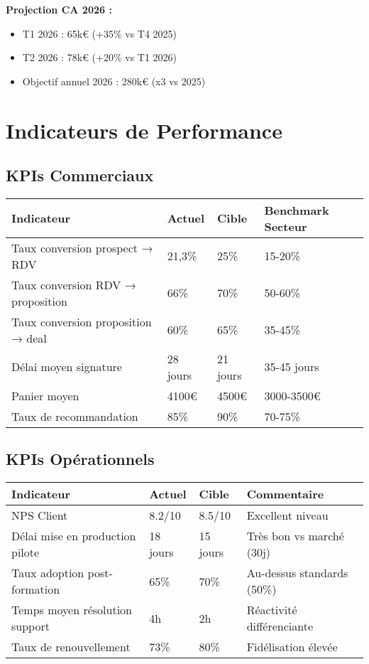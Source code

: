 \textbf{Projection CA 2026 :}
\begin{itemize}
    \item T1 2026 : 65k€ (+35\% vs T4 2025)
    \item T2 2026 : 78k€ (+20\% vs T1 2026)
    \item Objectif annuel 2026 : 280k€ (x3 vs 2025)
\end{itemize}

\section{Indicateurs de Performance}

\subsection{KPIs Commerciaux}

\begin{longtable}{@{}p{5cm}p{3cm}p{3cm}p{3cm}@{}}
\toprule
\textbf{Indicateur} & \textbf{Actuel} & \textbf{Cible} & \textbf{Benchmark Secteur} \\
\midrule
Taux conversion prospect → RDV & 21,3\% & 25\% & 15-20\% \\
Taux conversion RDV → proposition & 66\% & 70\% & 50-60\% \\
Taux conversion proposition → deal & 60\% & 65\% & 35-45\% \\
Délai moyen signature & 28 jours & 21 jours & 35-45 jours \\
Panier moyen & 4100€ & 4500€ & 3000-3500€ \\
Taux de recommandation & 85\% & 90\% & 70-75\% \\
\bottomrule
\end{longtable}

\subsection{KPIs Opérationnels}

\begin{longtable}{@{}p{5cm}p{3cm}p{3cm}p{3cm}@{}}
\toprule
\textbf{Indicateur} & \textbf{Actuel} & \textbf{Cible} & \textbf{Commentaire} \\
\midrule
NPS Client & 8.2/10 & 8.5/10 & Excellent niveau \\
Délai mise en production pilote & 18 jours & 15 jours & Très bon vs marché (30j) \\
Taux adoption post-formation & 65\% & 70\% & Au-dessus standards (50\%) \\
Temps moyen résolution support & 4h & 2h & Réactivité différenciante \\
Taux de renouvellement & 73\% & 80\% & Fidélisation élevée \\
\bottomrule
\end{longtable}

